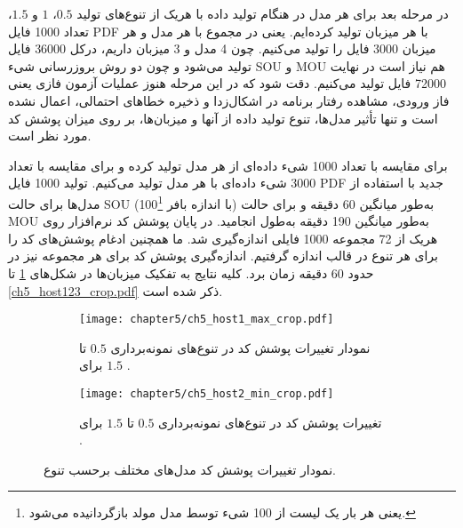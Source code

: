  
 در مرحله بعد برای هر مدل در هنگام تولید داده با هریک از تنوع‌های تولید $0.5$، $1$ و $1.5$، تعداد 1000 فایل \gls{PDF} با هر میزبان تولید کرده‌ایم. یعنی در مجموع با هر مدل و هر میزبان 3000 فایل را تولید می‌کنیم. چون 4 مدل و 3 میزبان داریم، درکل 36000 فایل تولید می‌شود و چون دو روش بروزرسانی شیء
  \gls{SOU} 
  و 
  \gls{MOU} هم نیاز است در نهایت 72000 فایل تولید می‌کنیم. دقت شود که در این مرحله هنوز عملیات آزمون فازی یعنی فاز ورودی، مشاهده رفتار برنامه در اشکال‌زدا و ذخیره خطاهای احتمالی، اعمال نشده است و تنها تأثیر مدل‌ها، تنوع تولید داده از آنها و میزبان‌ها، بر روی میزان پوشش کد مورد نظر است.
  
  \hspace{0.5mm}
  برای مقایسه با 
  تعداد 1000 شیء داده‌ای از هر مدل تولید کرده و برای مقایسه با 
  تعداد 3000 شیء داده‌ای با هر مدل تولید می‌کنیم. 
  تولید 1000 فایل
  \gls{PDF}
  جدید با استفاده از مدل‌ها برای حالت \gls{SOU}  (با اندازه بافر
  100\footnote{یعنی هر بار یک لیست از 100 شیء توسط مدل مولد بازگردانیده می‌شود.}) 
  به‌طور میانگین 60 دقیقه و برای حالت \gls{MOU} به‌طور میانگین 190 دقیقه به‌طول انجامید. در پایان پوشش کد نرم‌افزار  روی هریک از 72 مجموعه 1000 فایلی اندازه‌گیری شد. ما همچنین ادغام پوشش‌های کد را برای هر تنوع در قالب  اندازه ‌گرفتیم. اندازه‌گیری پوشش کد برای هر مجموعه نیز در حدود 60 دقیقه زمان برد. کلیه نتایج به تفکیک میزبان‌ها در شکل‌های \ref{ch5_host1_max_crop} تا \ref{ch5_host123_crop.pdf}  ذکر شده است.
 
 
 
 \begin{figure}%
	\centering
 \begin{subfigure}{\linewidth}
 	\centering
 	\texttt{[image: chapter5/ch5\_host1\_max\_crop.pdf]}
 	\caption[نمودار تغییرات پوشش کد در تنوع‌های نمونه‌برداری $0.5$ تا $1.5$  برای \_max]
 	{
 		نمودار تغییرات پوشش کد در تنوع‌های نمونه‌برداری $0.5$ تا $1.5$  برای  .
 	}
 	\label{ch5_host1_max_crop}
 \end{subfigure}
	\vspace{0.75cm}

  \begin{subfigure}{\linewidth}

 	\centering
 	\texttt{[image: chapter5/ch5\_host2\_min\_crop.pdf]}
 	\caption[ تغییرات پوشش کد در تنوع‌های نمونه‌برداری $0.5$ تا $1.5$  برای  ]
 	{
 		تغییرات پوشش کد در تنوع‌های نمونه‌برداری $0.5$ تا $1.5$  برای .
 	}
 	\label{ch5_host2_min_crop.pdf}
\end{subfigure}
\vspace{1cm}

 \caption[نمودار تغییرات پوشش کد مدل‌های مختلف برحسب تنوع.]{
 	 نمودار تغییرات پوشش کد مدل‌های مختلف برحسب تنوع.   
  }
 
\end{figure}


